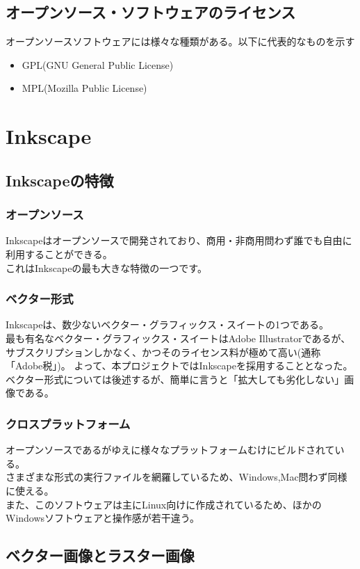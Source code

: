 \documentclass{ltjsarticle}
\begin{document}
\subsection{オープンソース・ソフトウェアのライセンス}
オープンソースソフトウェアには様々な種類がある。以下に代表的なものを示す
\begin{itemize}
    \item GPL(GNU General Public License)
    \item MPL(Mozilla Public License)
\end{itemize}
\section{Inkscape}
\subsection{Inkscapeの特徴}
\subsubsection{オープンソース}
Inkscapeはオープンソースで開発されており、商用・非商用問わず誰でも自由に利用することができる。\\
これはInkscapeの最も大きな特徴の一つです。
\subsubsection{ベクター形式}
Inkscapeは、数少ないベクター・グラフィックス・スイートの1つである。\\
最も有名なベクター・グラフィックス・スイートはAdobe Illustratorであるが、サブスクリプションしかなく、かつそのライセンス料が極めて高い(通称「Adobe税」)。
よって、本プロジェクトではInkscapeを採用することとなった。\\
ベクター形式については後述するが、簡単に言うと「拡大しても劣化しない」画像である。\\
\subsubsection{クロスプラットフォーム}
オープンソースであるがゆえに様々なプラットフォームむけにビルドされている。\\
さまざまな形式の実行ファイルを網羅しているため、Windows,Mac問わず同様に使える。\\
また、このソフトウェアは主にLinux向けに作成されているため、ほかのWindowsソフトウェアと操作感が若干違う。
\subsection{ベクター画像とラスター画像}
\end{document}
